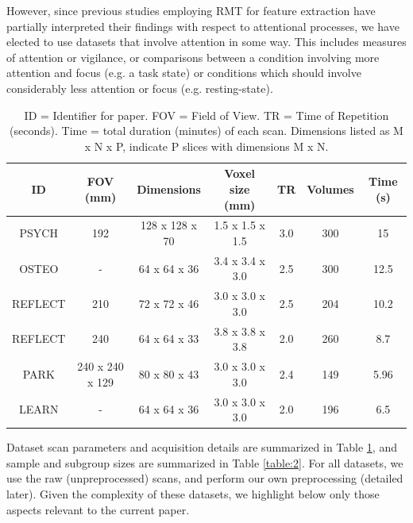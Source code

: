\documentclass[NETN,manuscript]{stjour-new}
\begin{document}
However, since previous studies employing RMT for feature extraction
\citep{wangRandomMatrixTheory2016,matharooSpontaneousBackpainAlters2020} have partially interpreted
their findings with respect to attentional processes, we have elected to use datasets that involve
attention in some way. This includes measures of attention or vigilance, or comparisons between a
condition involving more attention and focus (e.g. a task state) or conditions which should involve
considerably less attention or focus (e.g. resting-state).

\begin{table}[h!]
\small
\centering
\begin{tabular}{ c c c c c c c }
\hline
\textbf{ID}  & \textbf{FOV (mm)}  & \textbf{Dimensions}  & \textbf{Voxel size (mm)} & \textbf{TR} & \textbf{Volumes} & \textbf{Time (s)} \\
\hline
PSYCH   &  192              & 128 x 128 x 70 & 1.5 x 1.5 x 1.5 & 3.0 & 300 & 15 \\
OSTEO   &  -                & 64 x 64 x 36   & 3.4 x 3.4 x 3.0 & 2.5 & 300 & 12.5 \\
REFLECT &  210              & 72 x 72 x 46   & 3.0 x 3.0 x 3.0 & 2.5 & 204 & 10.2 \\
REFLECT &  240              & 64 x 64 x 33   & 3.8 x 3.8 x 3.8 & 2.0 & 260 & 8.7 \\
PARK    &  240 x 240 x 129  & 80 x 80 x 43   & 3.0 x 3.0 x 3.0 & 2.4 & 149 & 5.96 \\
LEARN   &  -                & 64 x 64 x 36   & 3.0 x 3.0 x 3.0 & 2.0 & 196 & 6.5 \\
\hline
\end{tabular}
\caption{
    ID = Identifier for paper. FOV = Field of View. TR = Time of Repetition (seconds).
    Time = total duration (minutes) of each scan. Dimensions listed as M x N x P,
    indicate P slices with dimensions M x N.
}
\label{table:1}
\end{table}


Dataset scan parameters and acquisition details are summarized in Table \ref{table:1}, and sample
and subgroup sizes are summarized in Table \ref{table:2}. For all datasets, we use the raw
(unpreprocessed) scans, and perform our own preprocessing (detailed later). Given the complexity of
these datasets, we highlight below only those aspects relevant to the current paper.
\end{document}
